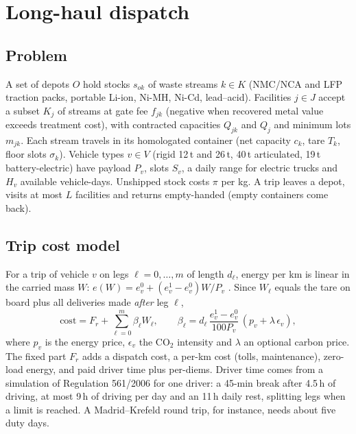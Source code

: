 \documentclass[11pt,a4paper]{article}
\begin{document}
\section{Long-haul dispatch}
\label{sec:longhaul}
\subsection{Problem}
A set of depots $O$ hold stocks $s_{ok}$ of waste streams $k\in K$ (NMC/NCA and LFP traction packs, portable Li-ion, Ni-MH, Ni-Cd, lead--acid). Facilities $j\in J$ accept a subset $K_j$ of streams at gate fee $f_{jk}$ (negative when recovered metal value exceeds treatment cost), with contracted capacities $Q_{jk}$ and $Q_j$ and minimum lots $m_{jk}$. Each stream travels in its homologated container (net capacity $c_k$, tare $T_k$, floor slots $\sigma_k$). Vehicle types $v\in V$ (rigid 12\,t and 26\,t, 40\,t articulated, 19\,t battery-electric) have payload $P_v$, slots $S_v$, a daily range for electric trucks and $H_v$ available vehicle-days. Unshipped stock costs $\pi$ per kg. A trip leaves a depot, visits at most $L$ facilities and returns empty-handed (empty containers come back).

\subsection{Trip cost model}
For a trip of vehicle $v$ on legs $\ell=0,\dots,m$ of length $d_\ell$, energy per km is linear in the carried mass $W$: $e(W)=e_v^0+(e_v^1-e_v^0)W/P_v$ \citep{xiao2012,bektas2011}. Since $W_\ell$ equals the tare on board plus all deliveries made \emph{after} leg $\ell$,
\begin{equation}
\text{cost}=F_r+\sum_{\ell=0}^{m}\beta_\ell W_\ell,\qquad \beta_\ell=d_\ell\,\frac{e^1_v-e^0_v}{100P_v}\,(p_v+\lambda\,\epsilon_v),
\end{equation}
where $p_v$ is the energy price, $\epsilon_v$ the CO$_2$ intensity and $\lambda$ an optional carbon price. The fixed part $F_r$ adds a dispatch cost, a per-km cost (tolls, maintenance), zero-load energy, and paid driver time plus per-diems. Driver time comes from a simulation of Regulation 561/2006 for one driver: a 45-min break after 4.5\,h of driving, at most 9\,h of driving per day and an 11\,h daily rest, splitting legs when a limit is reached. A Madrid--Krefeld round trip, for instance, needs about five duty days.
\end{document}
